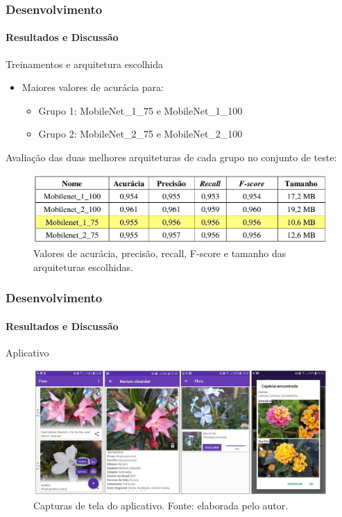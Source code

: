 \documentclass{beamer}
\begin{document}
    \begin{frame}[t]
    		\frametitle{Desenvolvimento}
    		\framesubtitle{Resultados e Discussão}
       	Treinamentos e arquitetura escolhida \medskip    
    		\begin{itemize}
      		\item Maiores valores de acurácia para:
			\begin{itemize}
				\item Grupo 1: MobileNet\_1\_75 e MobileNet\_1\_100
				\item Grupo 2: MobileNet\_2\_75 e MobileNet\_2\_100 \medskip
			\end{itemize}	      		
		\end{itemize}		
		{
			Avaliação das duas melhores arquiteturas de cada grupo no conjunto de teste:
			\visible<3->
			{
				\begin{figure}[hbt]
      	 		\begin{center}
      			\includegraphics[height=.2 \textwidth]{img/all_metrics_2.png}
      			\end{center}
      			\caption{Valores de acurácia, precisão, recall, F-score e tamanho das arquiteturas escolhidas.}
      			\end{figure}	
			}
		}       	      	
    \end{frame}
	
	\begin{frame}[t]
    		\frametitle{Desenvolvimento}
    		\framesubtitle{Resultados e Discussão}		
		Aplicativo
		\begin{figure}[hbt]
      	 		\begin{center}
      			\includegraphics[height=.45 \textwidth]{img/print1.png}
      			\end{center}
      			\caption{Capturas de tela do aplicativo. Fonte: elaborada pelo autor.}
      			\end{figure}	
    \end{frame}  
    
\end{document}
